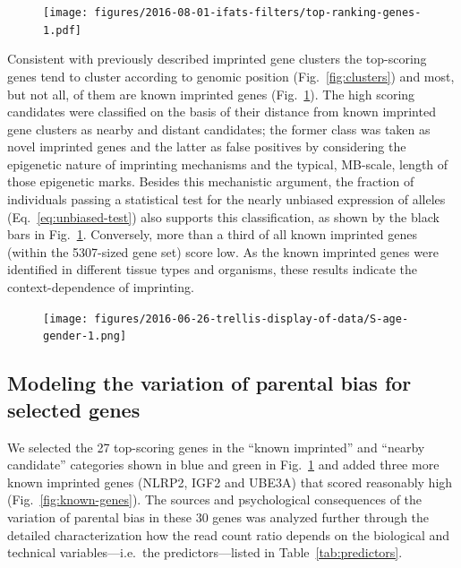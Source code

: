 \documentclass[letterpaper]{article}
\begin{document}
\begin{figure}
\begin{center}
\texttt{[image: figures/2016-08-01-ifats-filters/top-ranking-genes-1.pdf]}
\caption{}
\label{fig:top-genes}
\end{center}
\end{figure}

Consistent with previously described imprinted gene clusters the top-scoring
genes tend to cluster according to genomic position (Fig.~\ref{fig:clusters})
and most, but not all, of them are known imprinted genes
(Fig.~\ref{fig:top-genes}).  The high scoring candidates were classified on
the basis of their distance from known imprinted gene clusters as nearby and
distant candidates; the former class was taken as novel imprinted genes and
the latter as false positives by considering the epigenetic nature of
imprinting mechanisms and the typical, MB-scale, length of those epigenetic
marks.  Besides this mechanistic argument, the fraction of individuals passing
a statistical test for the nearly unbiased expression of alleles
(Eq.~\ref{eq:unbiased-test}) also supports this classification, as shown by
the black bars in Fig.~\ref{fig:top-genes}. Conversely, more than a third of
all known imprinted genes (within the 5307-sized gene set) score low.  As the
known imprinted genes were identified in different tissue types and organisms,
these results indicate the context-dependence of imprinting.

\begin{figure}
\begin{center}
\texttt{[image: figures/2016-06-26-trellis-display-of-data/S-age-gender-1.png]}
\caption{}
\label{fig:S-age-gender}
\end{center}
\end{figure}

\subsection{Modeling the variation of parental bias for selected genes}
\label{sec:results-regression}

We selected the 27 top-scoring genes in the ``known imprinted'' and ``nearby
candidate'' categories shown in blue and green in Fig.~\ref{fig:top-genes} and
added three more known imprinted genes (NLRP2, IGF2 and UBE3A) that scored
reasonably high (Fig.~\ref{fig:known-genes}).  The sources and psychological
consequences of the variation of parental bias in these 30 genes was analyzed
further through the detailed characterization how the read count ratio depends
on the biological and technical variables---i.e.~the predictors---listed in Table~\ref{tab:predictors}.
\end{document}
